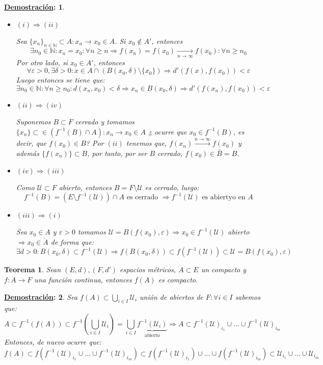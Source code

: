 \documentclass[10pt,a4paper,openright]{book}
\theoremstyle{break}
\newtheorem*{theo}{Teorema}
\newtheorem*{demo}{\underline{Demostración}:}
\begin{document}
\begin{demo}
\begin{itemize}
\item $(i) \Rightarrow (ii)$ 

Sea $\{x_n\}_{n \in \mathbb{N}} \subset A : x_n \to x_0 \in A$. Si $x_0 \notin A'$, entonces $$\exists n_0 \in \mathbb{N} : x_n = x_0 : \forall n \geq n \Rightarrow f(x_n) = f(x_0) \xrightarrow[n\rightarrow\infty]{} f(x_0) : \forall n \geq n_0$$
Por otro lado, si $x_0 \in A'$, entonces 
$$\forall\varepsilon > 0, \exists \delta > 0 : x \in A \cap (B(x_0, \delta) \setminus \{x_0\}) \Rightarrow d'(f(x), f(x_0)) < \varepsilon$$
Luego entonces se tiene que:
$$\exists n_0 \in \mathbb{N} : \forall n \geq n_0 : d(x_n, x_0) < \delta \Rightarrow x_n \in B(x_0, \delta) \Rightarrow d'(f(x_n), f(x_0)) < \varepsilon$$

\item $(ii) \Rightarrow (iv)$

Suponemos $B \subset F$ cerrado y tomamos $\{x_n\} \subset \in (f^{-1}(B) \cap A) : x_n \to x_0 \in A$ ¿ ocurre que $x_0 \in f^{-1}(B)$, es decir, que $f(x_0) \in B$? Por $(ii)$ tenemos que, $f(x_n) \xrightarrow{n\rightarrow\infty} f(x_0)$ y además $\{f(x_n)\} \subset B$, por tanto, por ser $B$ cerrado, $f(x_0) \in \bar{B} = B$.

\item $(iv) \Rightarrow (iii)$

Como $\mathcal{U} \subset F$ abierto, entonces $B = F \setminus \mathcal{U}$ es cerrado, luego:
$$f^{-1}(B) = (E \setminus f^{-1} (\mathcal{U})) \cap A \mbox{ es cerrado }\Rightarrow f^{-1}(\mathcal{U}) \mbox{ es abiertyo en } A$$

\item $(iii) \Rightarrow (i)$

Sea $x_0 \in A $ y $\varepsilon > 0$ tomamos $\mathcal{U} = B(f(x_0), \varepsilon) \Rightarrow x_0 \in f^{-1} (\mathcal{U})$ abierto $\Rightarrow x_0\in\mathring{A}$ de forma que:
$$\exists d > 0 : B(x_0, \delta) \subset f^{-1} (\mathcal{U}) \Rightarrow f(B(x_0, \delta)) \subset f(f^{-1} (\mathcal{U})) \subset \mathcal{U} = B(f(x_0), \varepsilon)$$ 
\end{itemize}
\end{demo}

\begin{theo}
Sean $(E,d),(F,d')$ espacios métricos, $A \subset E$ un compacto y $f : A \to F$ una función continua, entonces $f(A)$ es compacto.
\end{theo}
\begin{demo}
Sea $f(A) \subset \bigcup_{i \in I} \mathcal{U}_i$ unión de abiertos de $F : \forall i \in I$ sabemos que:
$$A \subset f^{-1} (f(A)) \subset f^{-1} \left(\bigcup_{i \in I} \mathcal{U}_i \right) = \bigcup_{i \in I} \underbrace{f^{-1}\left(\mathcal{U}_i\right)}_{\mbox{abierto}} \Rightarrow A \subset f^{-1}(\mathcal{U})_{i_1} \cup \ldots \cup f^{-1}(\mathcal{U})_{i_m}$$
Entonces, de nuevo ocurre que:
$$f(A) \subset f(f^{-1}(\mathcal{U})_{i_1} \cup \ldots \cup f^{-1}(\mathcal{U})_{i_m}) \subset f(f^{-1}(\mathcal{U})_{i_1}) \cup \ldots \cup f(f^{-1}(\mathcal{U})_{i_m}) \subset \mathcal{U}_{i_1} \cup \ldots \cup \mathcal{U}_{i_m}$$
\end{demo}
\end{document}
